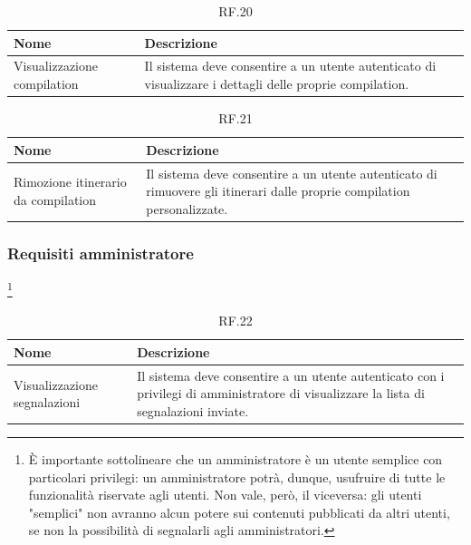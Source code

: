 \documentclass{natourDoc}
\begin{document}
\begin{table}[H]
	\centering
	\begin{tabular}{ |p{5cm}|p{10.3cm}| }
		\hline
		\rowcolor{PineGreen!70}
		\textbf{Nome}               & \textbf{Descrizione}                                                          \\
		\hline
		Visualizzazione compilation & Il sistema deve consentire a un utente autenticato di visualizzare i dettagli
		delle proprie compilation.                                                                                  \\
		\hline
	\end{tabular}
	\caption{RF.20}

\end{table}


\begin{table}[H]
	\centering
	\begin{tabular}{ |p{5cm}|p{10.3cm}| }
		\hline
		\rowcolor{PineGreen!70}
		\textbf{Nome}                       & \textbf{Descrizione}                                                          \\
		\hline
		Rimozione itinerario da compilation & Il sistema deve consentire a un utente autenticato di rimuovere gli itinerari
		dalle proprie compilation personalizzate.                                                                           \\
		\hline
	\end{tabular}
	\caption{RF.21}

\end{table}

\subsubsection{Requisiti amministratore}\footnote{È importante sottolineare che un amministratore è un utente semplice con particolari privilegi: 
un amministratore potrà, dunque, usufruire di tutte le funzionalità riservate agli 
utenti. Non vale, però, il viceversa: gli utenti "semplici" non avranno alcun potere 
sui contenuti pubblicati da altri utenti, se non la possibilità di segnalarli agli 
amministratori.}
\begin{table}[H]
	\centering
	\begin{tabular}{ |p{5cm}|p{10.3cm}| }
		\hline
		\rowcolor{PineGreen!70}
		\textbf{Nome}                & \textbf{Descrizione}                                                                                \\
		\hline
		Visualizzazione segnalazioni & Il sistema deve consentire a un utente autenticato con i privilegi di amministratore di visualizzare
		la lista di segnalazioni inviate.                                                                                                  \\
		\hline
	\end{tabular}
	\caption{RF.22}

\end{table}
\end{document}
